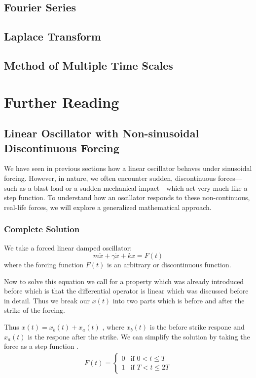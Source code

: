 \documentclass[10pt,twoside]{report}
\begin{document}

\section{Fourier Series}
\section{Laplace Transform}

\section{Method of Multiple Time Scales}
\chapter{Further Reading}
\section{Linear Oscillator with Non-sinusoidal Discontinuous Forcing}
We have seen in previous sections how a linear oscillator behaves under sinusoidal forcing. However, in nature, we often encounter sudden, discontinuous forces—such as a blast load or a sudden mechanical impact—which act very much like a step function. To understand how an oscillator responds to these non-continuous, real-life forces, we will explore a generalized mathematical approach.

\subsection{Complete Solution} 
We take a forced linear damped oscillator:
\begin{equation*}
    m\ddot{x} + \gamma\dot{x} + kx = F(t)
\end{equation*}
where the forcing function $F(t)$ is an arbitrary or discontinuous function. 

Now to solve this equation we call for a property which was already introduced before which is that 
the differential operator is linear which was discussed before in detail. Thus we break our $x(t)$
into two parts which is before and after the strike of the forcing.

Thus $x(t) = x_b(t) + x_a(t)$ , where $x_b(t)$ is the before strike respone 
and $x_a(t)$
is the respone after the strike. We can simplify the solution by taking the 
force as a step function .
\begin{align*}
    F(t) = 
\begin{cases} 
      0 & \text{if } 0 < t \le T \\
      1 & \text{if } T < t \le 2T 
\end{cases}
\end{align*}
\end{document}

